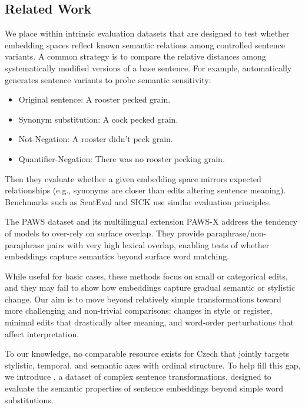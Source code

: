 \subsection{Related Work}
We place \costra within intrinsic evaluation datasets that are designed to test whether embedding spaces reflect known semantic relations among controlled sentence variants. A common strategy is to compare the relative distances among systematically modified versions of a base sentence. For example, \cite{zhu-etal-2018-exploring} automatically generates sentence variants to probe semantic sensitivity:

\begin{itemize}
    \item[(1)] Original sentence: A rooster pecked grain.
    \item[(2)] Synonym substitution: A cock pecked grain.
    \item[(3)] Not-Negation:  A rooster didn't peck grain.
    \item[(4)] Quantifier-Negation: There was no rooster pecking grain.
\end{itemize}

Then they evaluate whether a given embedding space mirrors expected relationships (e.g., synonyms are closer than edits altering sentence meaning). Benchmarks such as SentEval \citep{senteval} and SICK \citep{marelli-etal-2014-sick} use similar evaluation principles.

The PAWS dataset \citep{zhang-etal-2019-paws} and its multilingual extension PAWS-X \citep{yang-etal-2019-paws} address the tendency of models to over-rely on surface overlap. They provide paraphrase/non-paraphrase pairs with very high lexical overlap, enabling tests of whether embeddings capture semantics beyond surface word matching. 

While useful for basic cases, these methods focus on small or categorical edits, and they may fail to show how embeddings capture gradual semantic or stylistic change. Our aim is to move beyond relatively simple transformations \citep{zhu-etal-2018-exploring, ribeiro-etal-2020-beyond, dhole-etal-2023-nl, chiang-etal-2023-revealing} toward more challenging and non-trivial comparisons: changes in style or register, minimal edits that drastically alter meaning, and word-order perturbations that affect interpretation.

To our knowledge, no comparable resource exists for Czech that jointly targets stylistic, temporal, and semantic axes with ordinal structure. To help fill this gap, we introduce \costra, a dataset of complex sentence transformations, designed to evaluate the semantic properties of sentence embeddings beyond simple word substitutions.

